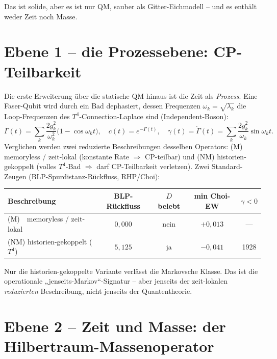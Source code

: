 Das ist solide, aber es ist nur QM, sauber als Gitter-Eichmodell -- und es
enthält weder Zeit noch Masse.

\section{Ebene 1 -- die Prozessebene: CP-Teilbarkeit}

Die erste Erweiterung über die statische QM hinaus ist die Zeit als
\emph{Prozess}. Eine Faser-Qubit wird durch ein Bad dephasiert, dessen
Frequenzen $\omega_k=\sqrt{\lambda_k}$ die Loop-Frequenzen des
$T^4$-Connection-Laplace sind (Independent-Boson):
\begin{equation}
  \Gamma(t)=\sum_k\frac{2g_k^2}{\omega_k^2}\bigl(1-\cos\omega_k t\bigr),\quad
  c(t)=e^{-\Gamma(t)},\quad
  \gamma(t)=\dot\Gamma(t)=\sum_k\frac{2g_k^2}{\omega_k}\sin\omega_k t.
\end{equation}
Verglichen werden zwei reduzierte Beschreibungen desselben Operators: (M)
memoryless / zeit-lokal (konstante Rate $\Rightarrow$ CP-teilbar) und (NM)
historien-gekoppelt (volles $T^4$-Bad $\Rightarrow$ darf CP-Teilbarkeit
verletzen). Zwei Standard-Zeugen (BLP-Spurdistanz-Rückfluss, RHP/Choi):

\begin{center}
\begin{tabular}{lcccc}
\toprule
Beschreibung & BLP-Rückfluss & $D$ belebt & min Choi-EW & $\gamma<0$ \\
\midrule
(M)\ \ memoryless / zeit-lokal      & $0{,}000$ & nein & $+0{,}013$ & --- \\
(NM) historien-gekoppelt ($T^4$)    & $5{,}125$ & ja   & $-0{,}041$ & 1928 \\
\bottomrule
\end{tabular}
\end{center}

Nur die historien-gekoppelte Variante verlässt die Markovsche Klasse. Das ist
die operationale „jenseits-Markov``-Signatur -- aber jenseits der zeit-lokalen
\emph{reduzierten} Beschreibung, nicht jenseits der Quantentheorie.

\section{Ebene 2 -- Zeit und Masse: der Hilbertraum-Massenoperator}

